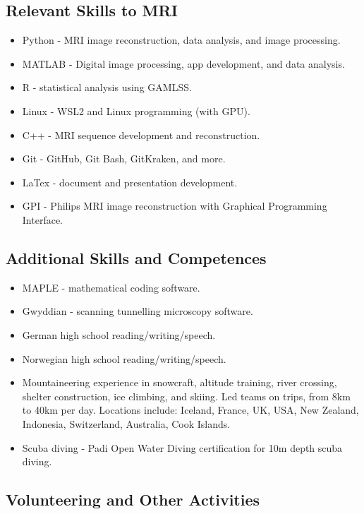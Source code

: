 \documentclass[12pt,]{scrartcl}
\begin{document}
\subsection{Relevant Skills to MRI}\label{relevant-skills}
\begin{itemize}
  \leftskip-0.25in
    \item Python - MRI image reconstruction, data analysis, and image processing.
    \item MATLAB - Digital image processing, app development, and data analysis.
    \item R - statistical analysis using GAMLSS.
    \item Linux - WSL2 and Linux programming (with GPU).
    \item C++ - MRI sequence development and reconstruction.
    \item Git - GitHub, Git Bash, GitKraken, and more.
    \item LaTex - document and presentation development.
    \item GPI - Philips MRI image reconstruction with Graphical Programming Interface.

\end{itemize}

\subsection{Additional Skills and Competences}\label{additional-skills-competences}
\begin{itemize}
  \leftskip-0.25in
    \item MAPLE - mathematical coding software.
    \item Gwyddian - scanning tunnelling microscopy software.
    \item German high school reading/writing/speech. 
    \item Norwegian high school reading/writing/speech. 
    \item Mountaineering experience in snowcraft, altitude training, river crossing, shelter construction, ice climbing, and skiing. Led teams on trips, from 8km to 40km per day. Locations include: Iceland, France, UK, USA, New Zealand, Indonesia, Switzerland, Australia, Cook Islands.
    \item Scuba diving - Padi Open Water Diving certification for 10m depth scuba diving. 

\end{itemize}

\subsection{Volunteering and Other Activities}\label{volunteering-other-activities}
\end{document}
